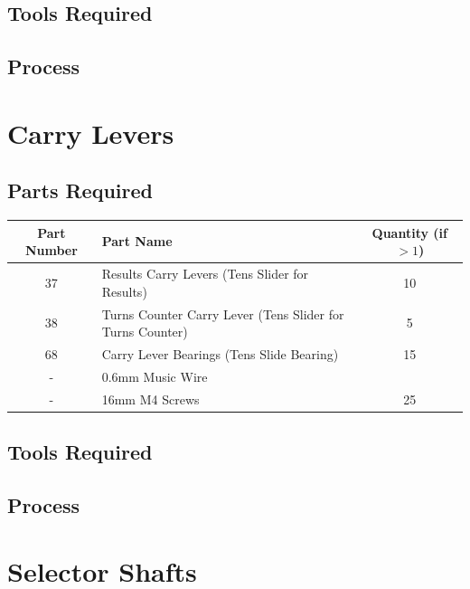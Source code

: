 \documentclass{article}
\begin{document}
\subsection{Tools Required}

\subsection{Process}

\newpage
\section{Carry Levers}
\subsection{Parts Required}
\begin{table}[h!]
	\centering
	\begin{tabular}{clc}
		Part Number & Part Name & Quantity (if $>1$) \\ \hline
		37 & Results Carry Levers (Tens Slider for Results) & 10 \\
		38 & Turns Counter Carry Lever (Tens Slider for Turns Counter) & 5 \\
		68 & Carry Lever Bearings (Tens Slide Bearing) & 15 \\ \hline \hline
		- & 0.6mm Music Wire & \\
		- & 16mm M4 Screws & 25
	\end{tabular}
\end{table}

\subsection{Tools Required}

\subsection{Process}


\newpage
\section{Selector Shafts}
\end{document}
